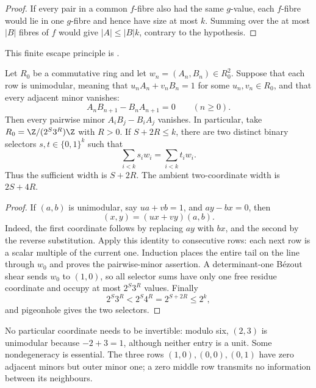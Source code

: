 \begin{proof}
If every pair in a common $f$-fibre also had the same $g$-value, each
$f$-fibre would lie in one $g$-fibre and hence have size at most $k$.
Summing over the at most $|B|$ fibres of $f$ would give
$|A|\le |B|k$, contrary to the hypothesis.
\end{proof}

\noindent This finite escape principle is
.

\begin{theorem}
\label{long1049:res:plucker-collapse}
Let $R_0$ be a commutative ring and let $w_n=(A_n,B_n)\in R_0^2$.  Suppose
that each row is unimodular, meaning that $u_nA_n+v_nB_n=1$ for some
$u_n,v_n\in R_0$, and that every adjacent minor vanishes:
\[
 A_nB_{n+1}-B_nA_{n+1}=0\qquad(n\ge0).
\]
Then every pairwise minor $A_iB_j-B_iA_j$ vanishes.  In particular, take
$R_0=\Z/(2^S3^R)\Z$ with $R>0$.  If $S+2R\le k$, there are two distinct
binary selectors $s,t\in\{0,1\}^{k}$ such that
\[
 \sum_{i<k}s_iw_i=\sum_{i<k}t_iw_i.
\]
Thus the sufficient width is $S+2R$.  The ambient two-coordinate width is
$2S+4R$.
\end{theorem}

\begin{proof}
If $(a,b)$ is unimodular, say $ua+vb=1$, and $ay-bx=0$, then
\[
 (x,y)=(ux+vy)(a,b).
\]
Indeed, the first coordinate follows by replacing $ay$ with $bx$, and the
second by the reverse substitution.  Apply this identity to consecutive rows:
each next row is a scalar multiple of the current one.  Induction places the
entire tail on the line through $w_0$ and proves the pairwise-minor assertion.
A determinant-one B\'ezout shear sends $w_0$ to
$(1,0)$, so all selector sums have only one free residue coordinate and occupy
at most $2^S3^R$ values.  Finally
\[
 2^S3^R<2^S4^R=2^{S+2R}\le2^k,
\]
and pigeonhole gives the two selectors.
\end{proof}

\noindent No particular coordinate needs to be invertible: modulo six,
$(2,3)$ is unimodular because $-2+3=1$, although neither entry is a unit.
Some nondegeneracy is essential.  The three rows $(1,0),(0,0),(0,1)$ have
zero adjacent minors but outer minor one; a zero middle row transmits no
information between its neighbours.

